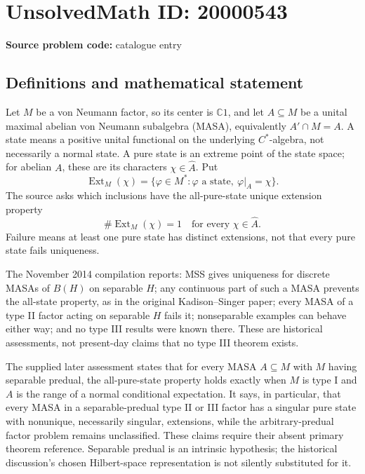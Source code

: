 \documentclass[11pt]{article}
\newcommand{\C}{\mathbb{C}}
\begin{document}
\section*{UnsolvedMath ID: 20000543}
\textbf{Source problem code:} catalogue entry
\subsection{Definitions and mathematical statement}
Let \(M\) be a von Neumann factor, so its center is \(\C1\), and let \(A\subseteq M\) be a unital maximal abelian von Neumann subalgebra (MASA), equivalently \(A'\cap M=A\). A state means a positive unital functional on the underlying \(C^*\)-algebra, not necessarily a normal state. A pure state is an extreme point of the state space; for abelian \(A\), these are its characters \(\chi\in\widehat A\). Put
\[
 \operatorname{Ext}_M(\chi)=\{\varphi\in M^*:\varphi\text{ a state},\ \varphi|_A=\chi\}.
\]
The source asks which inclusions have the all-pure-state unique extension property
\[
 \#\operatorname{Ext}_M(\chi)=1\quad\text{for every }\chi\in\widehat A.
\]
Failure means at least one pure state has distinct extensions, not that every pure state fails uniqueness.

The November 2014 compilation reports: MSS gives uniqueness for discrete MASAs of \(B(H)\) on separable \(H\); any continuous part of such a MASA prevents the all-state property, as in the original Kadison--Singer paper; every MASA of a type II factor acting on separable \(H\) fails it; nonseparable examples can behave either way; and no type III results were known there. These are historical assessments, not present-day claims that no type III theorem exists.

The supplied later assessment states that for every MASA \(A\subseteq M\) with \(M\) having separable predual, the all-pure-state property holds exactly when \(M\) is type I and \(A\) is the range of a normal conditional expectation. It says, in particular, that every MASA in a separable-predual type II or III factor has a singular pure state with nonunique, necessarily singular, extensions, while the arbitrary-predual factor problem remains unclassified. These claims require their absent primary theorem reference. Separable predual is an intrinsic hypothesis; the historical discussion's chosen Hilbert-space representation is not silently substituted for it.
\end{document}
